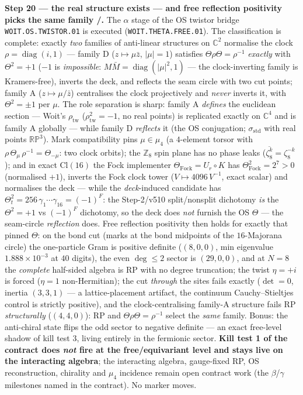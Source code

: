 \documentclass[11pt,a4paper]{article}
\newcommand{\Z}{\mathbb{Z}}
\theoremstyle{definition}
\begin{document}
\par\smallskip\noindent\textbf{Step 20 --- the real structure exists --- and free reflection
positivity picks the same family \mE/\mO.} The $\alpha$ stage of the OS twistor bridge
\texttt{WOIT.OS.TWISTOR.01} is executed (\texttt{WOIT.THETA.FREE.01}). The classification is
complete: exactly \emph{two} families of anti-linear structures on $\mathbb C^2$ normalise the clock
$\rho=\operatorname{diag}(i,1)$ --- family D ($z\mapsto\mu\bar z$, $|\mu|=1$) satisfies
$\Theta\rho\Theta=\rho^{-1}$ \emph{exactly} with $\Theta^2=+1$ ($-1$ is \emph{impossible}:
$M\bar M=\operatorname{diag}(|\mu|^2,1)$ --- the clock-inverting family is Kramers-free), inverts
the deck, and reflects the seam circle with two cut points; family A ($z\mapsto\mu/\bar z$)
centralises the clock projectively and \emph{never} inverts it, with $\Theta^2=\pm1$ per $\mu$.
The role separation is sharp: family A \emph{defines} the euclidean section --- Woit's
$\rho_{\mathrm{tw}}$ ($\rho_{\mathrm{tw}}^2=-1$, no real points) is replicated exactly on $\mathbb C^4$
and is family A globally --- while family D \emph{reflects} it (the OS conjugation;
$\sigma_{\mathrm{std}}$ with real points $\mathbb{RP}^3$). Mark compatibility pins
$\mu\in\mu_4$ (a $4$-element torsor with $\rho\,\Theta_\mu\,\rho^{-1}=\Theta_{-\mu}$: two clock
orbits); the $\Z_8$ spin plane has no phase leaks ($\overline{\zeta_8^k}=\zeta_8^{-k}$); and in
exact $\mathrm{Cl}(16)$ the Fock implementer $\Theta_{\mathrm{Fock}}=U_r\circ K$ has
$\Theta_{\mathrm{Fock}}^2=2^7>0$ (normalised $+1$), inverts the Fock clock tower
($V\mapsto4096\,V^{-1}$, exact scalar) and normalises the deck --- while the \emph{deck}-induced
candidate has $\Theta_t^2=256\,\gamma_1\cdots\gamma_{16}=(-1)^F$: the Step-2/v510 split/nonsplit
dichotomy \emph{is} the $\Theta^2=+1$ vs $(-1)^F$ dichotomy, so the deck does \emph{not} furnish
the OS $\Theta$ --- the seam-circle \emph{reflection} does. Free reflection positivity then holds
for exactly that pinned $\Theta$: on the bond cut (marks at the bond midpoints of the
$16$-Majorana circle) the one-particle Gram is positive definite ($(8,0,0)$, min eigenvalue
$1.888\times10^{-3}$ at $40$ digits), the even $\deg\le2$ sector is $(29,0,0)$, and at $N=8$ the
\emph{complete} half-sided algebra is RP with no degree truncation; the twist $\eta=+i$ is forced
($\eta=1$ non-Hermitian); the cut \emph{through} the sites fails exactly ($\det=0$, inertia
$(3,3,1)$ --- a lattice-placement artifact, the continuum Cauchy--Stieltjes control is strictly
positive), and the clock-centralising family-A structure fails RP \emph{structurally}
($(4,4,0)$): RP and $\Theta\rho\Theta=\rho^{-1}$ select the \emph{same} family. Bonus: the
anti-chiral state flips the odd sector to negative definite --- an exact free-level shadow of
kill test 3, living entirely in the fermionic sector. \textbf{Kill test 1 of the contract does
\emph{not} fire at the free/equivariant level and stays live on the interacting algebra}; the
interacting algebra, gauge-fixed RP, OS reconstruction, chirality and $\mu_4$ incidence remain
open contract work (the $\beta$/$\gamma$ milestones named in the contract). No marker moves.
\end{document}
